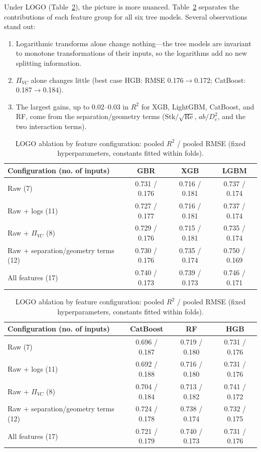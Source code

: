 \documentclass[12pt]{article}
\newcommand{\Stk}{\mathrm{Stk}}
\newcommand{\Rey}{\mathrm{Re}}
\newcommand{\PiVC}{\Pi_{VC}}
\begin{document}
\begin{table}[!ht]\centering\caption{Tuned protocol (10 grouped splits): raw versus 17 features. $\Delta$RMSE is (17 features)$-$(raw); negative is better.}\label{tab:tuned}\end{table}

Under LOGO (Table~\ref{tab:abl}), the picture is more nuanced. Table~\ref{tab:abl} separates the contributions of each feature group for all six tree models. Several observations stand out:
\begin{enumerate}[noitemsep]
\item Logarithmic transforms alone change nothing---the tree models are invariant to monotone transformations of their inputs, so the logarithms add no new splitting information.
\item $\PiVC$ alone changes little (best case HGB: RMSE 0.176$\to$0.172; CatBoost: 0.187$\to$0.184).
\item The largest gains, up to 0.02--0.03 in $R^2$ for XGB, LightGBM, CatBoost, and RF, come from the separation/geometry terms ($\Stk/\sqrt{\Rey}$, $ab/D_e^2$, and the two interaction terms).
\end{enumerate}

\begin{table}[!ht]\centering\caption{LOGO ablation by feature configuration: pooled $R^2$ / pooled RMSE (fixed hyperparameters, constants fitted within folds).}\label{tab:abl}\footnotesize
\begin{tabular}{lccc}\toprule Configuration (no. of inputs) & GBR & XGB & LGBM \\ \midrule
Raw (7) & 0.731 / 0.176 & 0.716 / 0.181 & 0.737 / 0.174 \\
Raw + logs (11) & 0.727 / 0.177 & 0.716 / 0.181 & 0.737 / 0.174 \\
Raw + $\Pi_{VC}$ (8) & 0.729 / 0.176 & 0.715 / 0.181 & 0.735 / 0.174 \\
Raw + separation/geometry terms (12) & 0.730 / 0.176 & 0.735 / 0.174 & 0.750 / 0.169 \\
All features (17) & 0.740 / 0.173 & 0.739 / 0.173 & 0.746 / 0.171 \\
\bottomrule\end{tabular}
\vspace{8pt}

\begin{tabular}{lccc}\toprule Configuration (no. of inputs) & CatBoost & RF & HGB \\ \midrule
Raw (7) & 0.696 / 0.187 & 0.719 / 0.180 & 0.731 / 0.176 \\
Raw + logs (11) & 0.692 / 0.188 & 0.716 / 0.180 & 0.731 / 0.176 \\
Raw + $\Pi_{VC}$ (8) & 0.704 / 0.184 & 0.713 / 0.182 & 0.741 / 0.172 \\
Raw + separation/geometry terms (12) & 0.724 / 0.178 & 0.738 / 0.174 & 0.732 / 0.175 \\
All features (17) & 0.721 / 0.179 & 0.740 / 0.173 & 0.731 / 0.176 \\
\bottomrule\end{tabular}
\end{table}
\end{document}
